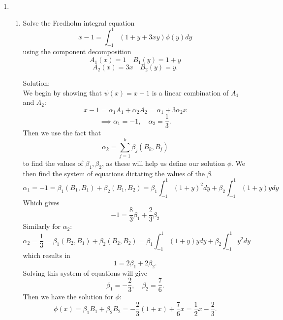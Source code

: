 \documentclass[12pt]{article}
\numberwithin{equation}{section}
\begin{document}
\begin{enumerate}
\begin{enumerate}
$$\begin{array}{cc}
    e^t\left[\begin{array}{cc}\cos t&\sin t\\ -\sin t&\cos t\end{array}\right]\frac{1}{1-e^{2\pi}}I(I)(I)e^{-\tau}\left[\begin{array}{cc}\cos\tau&-\sin\tau\\ \sin\tau&\cos\tau\end{array}\right],&t>\tau\end{array}\right.,$$
    $$G(t,\tau)=\left\{\begin{array}{cc}-\frac{e^{t+2\pi-\tau}}{1-e^{2\pi}}\left[\begin{array}{cc}\cos(t-\tau)&\sin(t-\tau)\\-\sin(t-\tau)&\cos(t-\tau)\end{array}\right],&t<\tau\\
    \frac{e^{t-\tau}}{1-e^{2\pi}}\left[\begin{array}{cc}\cos(t-\tau)&\sin(t-\tau)\\-\sin(t-\tau)&\cos(t-\tau)\end{array}\right],&t>\tau\end{array}\right..$$

    \end{enumerate}
    \item \begin{enumerate}\item Solve the Fredholm integral equation
    $$x-1=\int_{-1}^1(1+y+3xy)\phi(y)dy$$
    using the component decomposition
    $$A_1(x)=1\quad B_1(y)=1+y$$
    $$A_2(x)=3x\quad B_2(y)=y.$$

    Solution:\\

    We begin by showing that $\psi(x)=x-1$ is a linear combination of $A_1$ and $A_2$:
    $$x-1=\alpha_1A_1+\alpha_2 A_2=\alpha_1+3\alpha_2 x$$
    $$\implies \alpha_1=-1,\quad \alpha_2=\frac{1}{3}.$$
    Then we use the fact that
    $$\alpha_k=\sum_{j=1}^k\beta_j(B_k,B_j)$$
    to find the values of $\beta_1,\beta_2$, as these will help us define our solution $\phi$.
    We then find the system of equations dictating the values of the $\beta.$
    $$\alpha_1=-1=\beta_1(B_1,B_1)+\beta_2(B_1,B_2)=\beta_1\int_{-1}^1(1+y)^2dy+\beta_2\int_{-1}^1(1+y)ydy$$
    Which gives
    $$-1=\frac{8}{3}\beta_1+\frac{2}{3}\beta_2$$
    Similarly for $\alpha_2$:
    $$\alpha_2=\frac{1}{3}=\beta_1(B_2,B_1)+\beta_2(B_2,B_2)=\beta_1\int_{-1}^1(1+y)ydy+\beta_2\int_{-1}^1 y^2dy$$
    which results in
    $$1=2\beta_1+2\beta_2.$$
    Solving this system of equations will give
    $$\beta_1=-\frac{2}{3},\quad \beta_2=\frac{7}{6}.$$
    Then we have the solution for $\phi$:
    $$\phi(x)=\beta_1B_1+\beta_2B_2=-\frac{2}{3}(1+x)+\frac{7}{6} x=\frac{1}{2}x-\frac{2}{3}.$$


\end{enumerate}
\end{enumerate}
\end{document}
